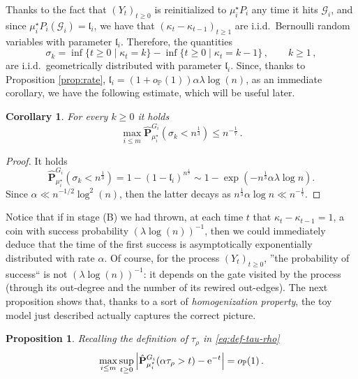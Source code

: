 \documentclass[11pt,oneside]{amsart}
\numberwithin{equation}{section}  %
\theoremstyle{plain}
\newtheorem{corollary}[theorem]{Corollary}
\newtheorem{proposition}[theorem]{Proposition}
\newcommand{\iid}{{i.i.d.~}}
\newcommand{\p}{\mathbb{P}}
\newcommand{\op}{o_{\p}}
\newcommand{\quench}{\mathbf{P}}
\newcommand{\gates}{\mathcal{G}}
\newcommand{\muqs}{\mu^\star_i}
\begin{document}
Thanks to the fact that $(Y_t)_{t \ge 0}$ is  reinitialized to $\muqs P_i$ any time it hits $\gates_i$, and since $\muqs P_i(\gates_{i})=\mathfrak{l}_i$,
we have that $(\kappa_t-\kappa_{t-1})_{t\ge 1}$ are \iid Bernoulli random variables with parameter $\mathfrak{l}_i$. Therefore,
 the quantities
\begin{equation}\label{eq:def-sigma-k}
	\sigma_k=\inf\{t\ge 0\mid \kappa_t=k\}-\inf\{t\ge 0\mid \kappa_t={k-1}\}\,,\qquad k\ge 1\,,
\end{equation}
are \iid geometrically distributed with parameter $\mathfrak{l}_i$. 
Since, thanks to Proposition \ref{prop:rate}, $\mathfrak{l}_i=(1+\op(1))\alpha\lambda\log(n)$, as an immediate corollary, we have the following estimate, which will be useful later.
\begin{corollary}\label{coro:sigma}
	For every $k\ge 0$ it holds
	\begin{equation}\label{eq:sigma}
		\max_{i \le m}\hat{\quench}^{G_i}_{\muqs}\left(\sigma_k<n^{\frac13} \right)\le n^{-\frac17} \,.
	\end{equation}

\end{corollary}
\begin{proof} It holds
    $$\hat{\quench}^{G_i}_{\muqs}\left(\sigma_k<n^{\frac 13} \right)=1-(1-\mathfrak{l}_i)^{n^{\frac 13}}\sim 1-\exp{(-n^{\frac13}\alpha\lambda \log n)}.$$
    Since $\alpha \ll n^{-1/2}\log^2(n)$, then the latter decays as $n^{\frac 13}\alpha \log n \ll n^{-\frac17}$.
\end{proof}
Notice that if in stage (B) we had thrown, at each time $t$ that $\kappa_t-\kappa_{t-1}=1$, a coin with success probability $(\lambda\log(n))^{-1}$, then we could immediately deduce that the time of the first success is asymptotically exponentially distributed with rate $\alpha$. Of course, for the process $(Y_t)_{t\ge 0}$, ''the probability of success`` is not $(\lambda\log(n))^{-1}$: it depends on the gate visited by the process (through its out-degree and the number of its rewired out-edges). The next proposition shows that, thanks to a sort of \emph{homogenization property}, the toy model just described  actually captures the correct picture. 
\begin{proposition}\label{prop:renewal}
	Recalling the definition of $\tau_{\rho}$ in \eqref{eq:def-tau-rho}
	\begin{equation}\label{eq:tau-rho}
		\max_{i \le m}\sup_{t \ge 0}\left|\hat{\quench}^{G_i}_{\muqs}(\alpha \tau_\rho> t)-{\rm e}^{-t}\right|=\op(1)\,.
	\end{equation}
\end{proposition}
\end{document}
